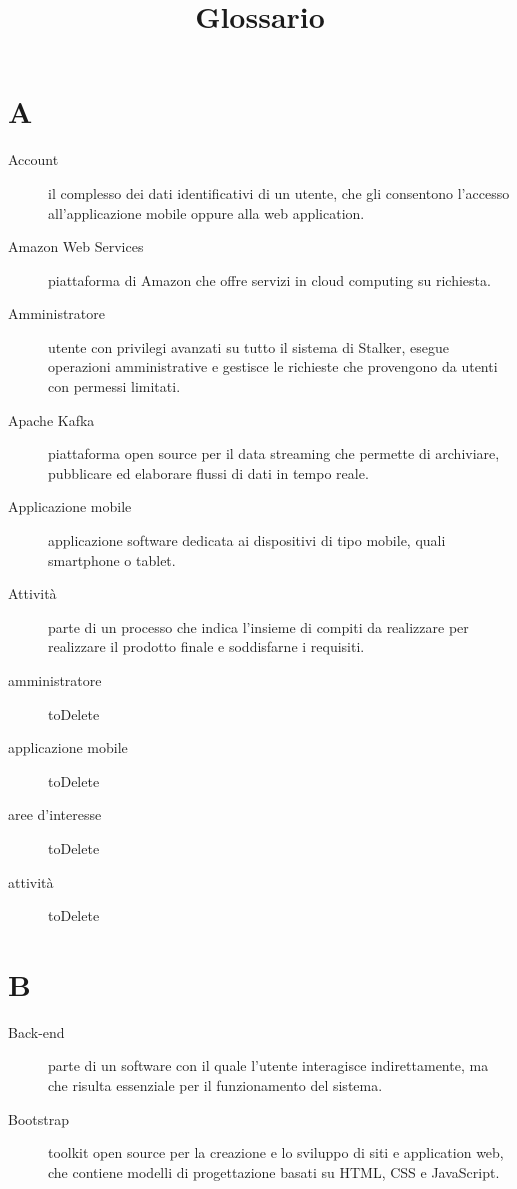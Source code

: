 \documentclass{article}
\title{Glossario}
\begin{document}


	\section{A}
	\begin{description}
		\item[Account] il complesso dei dati identificativi di un utente, che gli consentono l'accesso all'applicazione mobile oppure alla web application.
		\item[Amazon Web Services] piattaforma di Amazon che offre servizi in cloud computing su richiesta.
		\item[Amministratore] utente con privilegi avanzati su tutto il sistema di Stalker, esegue operazioni amministrative e gestisce le richieste che provengono da utenti con permessi limitati.
		\item[Apache Kafka] piattaforma open source per il data streaming che permette di archiviare, pubblicare ed elaborare flussi di dati in tempo reale.
		\item[Applicazione mobile] applicazione software dedicata ai dispositivi di tipo mobile, quali smartphone o tablet. 
		\item[Attività] parte di un processo che indica l'insieme di compiti da realizzare per realizzare il prodotto finale e soddisfarne i requisiti.
		\item[amministratore] toDelete
		\item[applicazione mobile] toDelete
		\item[aree d'interesse] toDelete
		\item[attività] toDelete
	\end{description}
	\section{B}
	\begin{description}
		\item[Back-end] parte di un software con il quale l'utente interagisce indirettamente, ma che risulta essenziale per il funzionamento del sistema.
		\item[Bootstrap] toolkit open source per la creazione e lo sviluppo di siti e application web, che contiene modelli di progettazione basati su HTML, CSS e JavaScript.
	\end{description}
\end{document}
